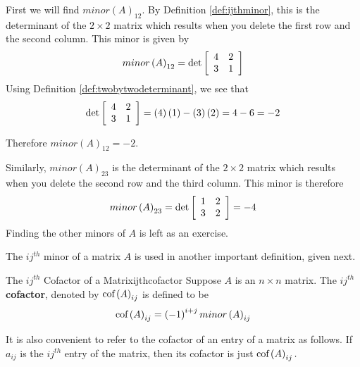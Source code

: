 \begin{solution} First we will find $minor\left( A\right) _{12}$. By Definition
\ref{def:ijthminor}, this is the determinant of the $2\times 2$ matrix
which results when you delete the first row and the second column. This
minor is given by
\begin{equation*}
minor \left(A\right)_{12}
=
\det \left[
\begin{array}{rr}
4 & 2 \\
3 & 1
\end{array}
\right]
\end{equation*}
Using Definition \ref{def:twobytwodeterminant}, we see that 
\begin{equation*}
\det \left[
\begin{array}{rr}
4 & 2 \\
3 & 1
\end{array}
\right] = \left(4\right)\left(1\right) - \left(3\right)\left(2\right) = 4 - 6 = -2
\end{equation*}

Therefore $minor \left(A\right)_{12} = -2$. 

Similarly, $minor\left(A\right)_{23}$ is the determinant of the $2\times 2$ matrix
which results when you delete the second row and the third column. This
minor is therefore
\begin{equation*}
minor \left(A\right)_{23} 
=
\det \left[
\begin{array}{rr}
1 & 2 \\
3 & 2
\end{array}
\right] = -4
\end{equation*}
Finding the other minors of $A$ is left as an exercise. 
\end{solution}

The $ij^{th}$ minor of a matrix $A$ is used in another important definition, given next.

\begin{definition}{The $ij^{th}$ Cofactor of a Matrix}{ijthcofactor}
Suppose $A$ is an $n\times n$ matrix. The $ij^{th}$ \textbf{cofactor}, denoted by $\mbox{cof}\left( A\right) _{ij}$ is
defined to be 
\begin{equation*}
\mbox{cof}\left( A\right) _{ij} = \left( -1\right) ^{i+j} minor\left(A\right)_{ij} 
\end{equation*}
\end{definition}

It is also convenient to refer to the
cofactor of an entry of a matrix as follows. If $a_{ij}$ is the $ij^{th}$ entry of the
matrix, then its cofactor is just $\mbox{cof}\left( A\right) _{ij}.$

